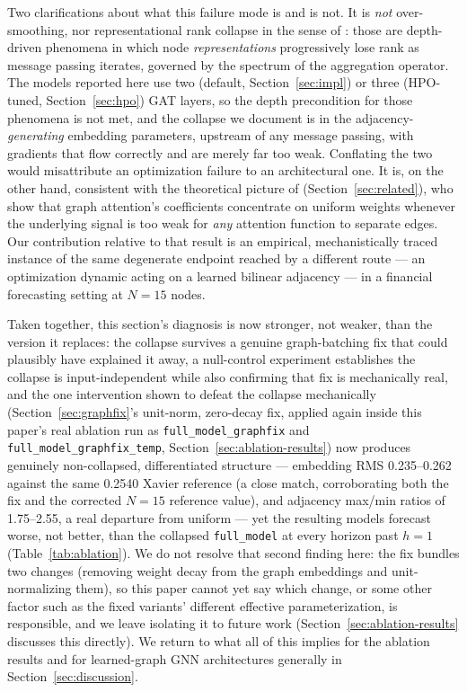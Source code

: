 \documentclass[journal]{IEEEtran}
\begin{document}
Two clarifications about what this failure mode is and is not. It is \emph{not} over-smoothing, nor representational rank collapse in the sense of \citet{RothLiebig2024}: those are depth-driven phenomena in which node \emph{representations} progressively lose rank as message passing iterates, governed by the spectrum of the aggregation operator. The models reported here use two (default, Section~\ref{sec:impl}) or three (HPO-tuned, Section~\ref{sec:hpo}) GAT layers, so the depth precondition for those phenomena is not met, and the collapse we document is in the adjacency-\emph{generating} embedding parameters, upstream of any message passing, with gradients that flow correctly and are merely far too weak. Conflating the two would misattribute an optimization failure to an architectural one. It is, on the other hand, consistent with the theoretical picture of \citet{Fountoulakis2023} (Section~\ref{sec:related}), who show that graph attention's coefficients concentrate on uniform weights whenever the underlying signal is too weak for \emph{any} attention function to separate edges. Our contribution relative to that result is an empirical, mechanistically traced instance of the same degenerate endpoint reached by a different route --- an optimization dynamic acting on a learned bilinear adjacency --- in a financial forecasting setting at $N=15$ nodes.

Taken together, this section's diagnosis is now stronger, not weaker, than the version it replaces: the collapse survives a genuine graph-batching fix that could plausibly have explained it away, a null-control experiment establishes the collapse is input-independent while also confirming that fix is mechanically real, and the one intervention shown to defeat the collapse mechanically (Section~\ref{sec:graphfix}'s unit-norm, zero-decay fix, applied again inside this paper's real ablation run as \texttt{full\_model\_graphfix} and \texttt{full\_model\_graphfix\_temp}, Section~\ref{sec:ablation-results}) now produces genuinely non-collapsed, differentiated structure --- embedding RMS 0.235--0.262 against the same 0.2540 Xavier reference (a close match, corroborating both the fix and the corrected $N=15$ reference value), and adjacency max/min ratios of 1.75--2.55, a real departure from uniform --- yet the resulting models forecast worse, not better, than the collapsed \texttt{full\_model} at every horizon past $h=1$ (Table~\ref{tab:ablation}). We do not resolve that second finding here: the fix bundles two changes (removing weight decay from the graph embeddings and unit-normalizing them), so this paper cannot yet say which change, or some other factor such as the fixed variants' different effective parameterization, is responsible, and we leave isolating it to future work (Section~\ref{sec:ablation-results} discusses this directly). We return to what all of this implies for the ablation results and for learned-graph GNN architectures generally in Section~\ref{sec:discussion}.
\end{document}
